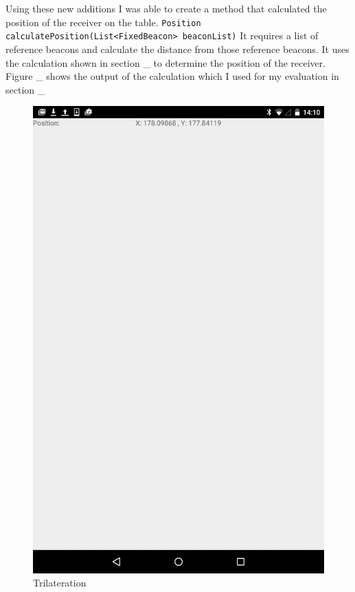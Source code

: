 Using these new additions I was able to create a method that calculated the position of the receiver on the table. \lstinline|Position calculatePosition(List<FixedBeacon> beaconList)| It requires a list of reference beacons and calculate the distance from those reference beacons. It uses the calculation shown in section \_ to determine the position of the receiver. 
Figure \_ shows the output of the calculation which I used for my evaluation in section \_
\begin{figure}[h]
  \includegraphics[scale=0.2]{images/trilateration}
  \protect\caption{Trilateration}
  \label{trilateration}
\end{figure}

